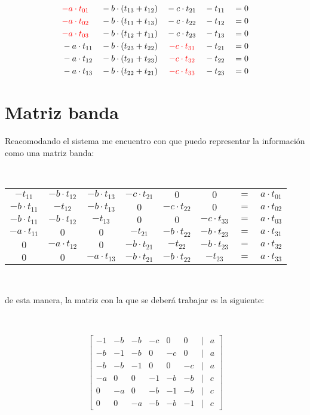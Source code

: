 \documentclass{article}
\begin{document}
\begin{align*}
    &\textcolor{red}{-a\cdot t_{01}}& &-b\cdot(t_{13} +t_{12})& &-c\cdot t_{21}& &-t_{11}& &= 0 \\
    &\textcolor{red}{-a\cdot t_{02}}& &-b\cdot(t_{11} +t_{13})& &-c\cdot t_{22}& &-t_{12}& &= 0 \\
    &\textcolor{red}{-a\cdot t_{03}}& &-b\cdot(t_{12} +t_{11})& &-c\cdot t_{23}& &-t_{13}& &= 0 \\
    &-a\cdot t_{11}& &-b\cdot(t_{23} +t_{22})& &~\textcolor{red}{-c\cdot t_{31}}& &-t_{21}& &= 0 \\
    &-a\cdot t_{12}& &-b\cdot(t_{21} +t_{23})& &~\textcolor{red}{-c\cdot t_{32}}& &-t_{22}& &= 0 \\
    &-a\cdot t_{13}& &-b\cdot(t_{22} +t_{21})& &~\textcolor{red}{-c\cdot t_{33}}& &-t_{23}& &= 0 \\
\end{align*}

\section*{Matriz banda}

Reacomodando el sistema me encuentro con que puedo representar la información como una matriz banda:

\

\begin{center}
    \begin{tabular}{c c c c c c c c}
        $-t_{11}$ & $-b\cdot t_{12}$ & $-b\cdot t_{13}$ & $-c\cdot t_{21}$ & $0$ & $0$ & $=$ & $a\cdot t_{01}$ \\
        $-b\cdot t_{11}$ & $-t_{12}$ & $-b\cdot t_{13}$ & $0$ & $-c\cdot t_{22}$ & $0$ & $=$ & $a\cdot t_{02}$ \\
        $-b\cdot t_{11}$ & $-b\cdot t_{12}$ & $-t_{13}$ & $0$ & $0$ & $-c\cdot t_{33}$ & $=$ & $a\cdot t_{03}$ \\
        $-a\cdot t_{11}$ & $0$ & $0$ & $-t_{21}$ & $-b\cdot t_{22}$ & $-b\cdot t_{23}$ & $=$ & $a\cdot t_{31}$ \\
        $0$ & $-a\cdot t_{12}$ & $0$ & $-b\cdot t_{21}$ & $-t_{22}$ & $-b\cdot t_{23}$ & $=$ & $a\cdot t_{32}$ \\
        $0$ & $0$ & $-a\cdot t_{13}$ & $-b\cdot t_{21}$ & $-b\cdot t_{22}$ & $-t_{23}$ & $=$ & $a\cdot t_{33}$
    \end{tabular}
\end{center}

\

de esta manera, la matriz con la que se deberá trabajar es la siguiente:

\

\[
\begin{bmatrix}
    -1 & -b & -b & -c & 0 & 0 & | & a \\
    -b & -1 & -b & 0 & -c & 0 & | & a \\
    -b & -b & -1 & 0 & 0 & -c & | & a \\
    -a & 0 & 0 & -1 & -b & -b & | & c \\
    0 & -a & 0 & -b & -1 & -b & | & c \\
    0 & 0 & -a & -b & -b & -1 & | & c
\end{bmatrix}
\]
\end{document}
